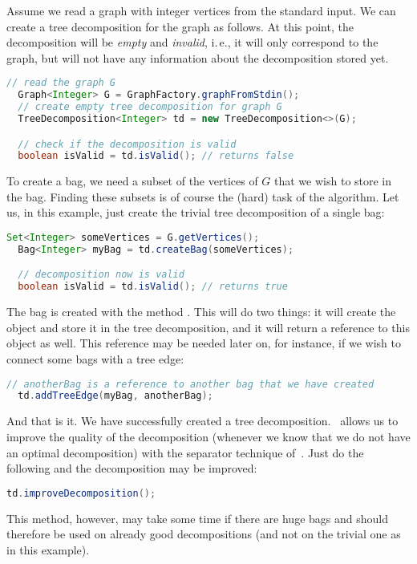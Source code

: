 \documentclass[a4paper, ukenglish, twoside, openright]{jdrasilmanual}
\begin{document}
Assume we read a graph with integer vertices from the standard
input. We can create a tree decomposition for the graph as
follows. At this point, the decomposition will be \emph{empty} and
\emph{invalid}, i.\,e., it will only correspond to the graph, but will
not have any information about the decomposition stored yet.
\begin{lstlisting}[language=Java]
  // read the graph G
  Graph<Integer> G = GraphFactory.graphFromStdin();
  // create empty tree decomposition for graph G
  TreeDecomposition<Integer> td = new TreeDecomposition<>(G);

  // check if the decomposition is valid
  boolean isValid = td.isValid(); // returns false
\end{lstlisting}
To create a bag, we need a subset of the vertices of $G$ that we wish
to store in the bag. Finding these subsets is of course the (hard) task of
the algorithm. Let us, in this example, just create the trivial tree
decomposition of a single bag:
\begin{lstlisting}[language=Java]
  Set<Integer> someVertices = G.getVertices();
  Bag<Integer> myBag = td.createBag(someVertices);

  // decomposition now is valid
  boolean isValid = td.isValid(); // returns true
\end{lstlisting}
The bag is created with the method . This will do
two things: it will create the  object and store it in the
tree decomposition, and it will return a reference to this
 object as well. This reference may be needed later on,
for instance, if we wish to connect some bags with a tree edge:
\begin{lstlisting}[language=Java]
  // anotherBag is a reference to another bag that we have created
  td.addTreeEdge(myBag, anotherBag);
\end{lstlisting}
And that is it. We have successfully created a tree
decomposition. \Jdrasil\ allows us to improve the quality of the
decomposition (whenever we know that we do not have an optimal
decomposition) with the separator technique
of~\cite{bodlaender2010treewidth}. Just do the following and the
decomposition may be improved:
\begin{lstlisting}[language=Java]
  td.improveDecomposition();
\end{lstlisting}
This method, however, may take some time if there are huge bags and
should therefore be used on already good decompositions (and not on the
trivial one as in this example).
\end{document}

